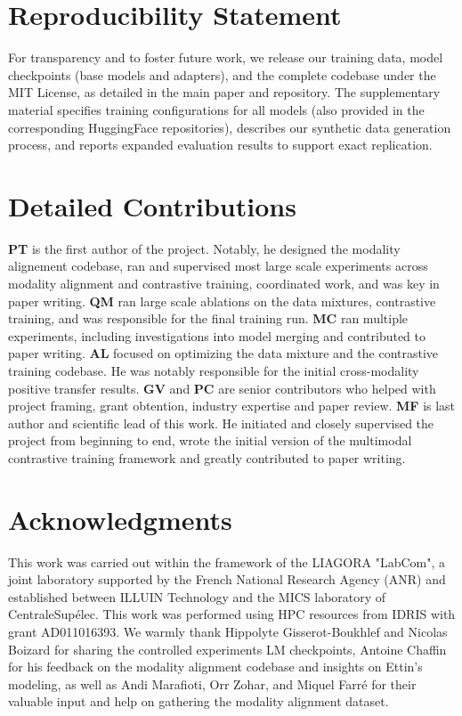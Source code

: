 \documentclass{article} %
\begin{document}
\section*{Reproducibility Statement}
For transparency and to foster future work, we release our training data, model checkpoints (base models and adapters), and the complete codebase under the MIT License, as detailed in the main paper and repository. The supplementary material specifies training configurations for all models (also provided in the corresponding HuggingFace repositories), describes our synthetic data generation process, and reports expanded evaluation results to support exact replication.

\ificlrfinal
\section*{Detailed Contributions}
\textbf{PT} is the first author of the project. Notably, he designed the modality alignement codebase, ran and supervised most large scale experiments across modality alignment and contrastive training, coordinated work, and was key in paper writing. 
\textbf{QM} ran large scale ablations on the data mixtures, contrastive training, and was responsible for the final training run.
\textbf{MC} ran multiple experiments, including investigations into model merging and contributed to paper writing.
\textbf{AL} focused on optimizing the data mixture and the contrastive training codebase. He was notably responsible for the initial cross-modality positive transfer results. 
\textbf{GV} and \textbf{PC} are senior contributors who helped with project framing, grant obtention, industry expertise and paper review.
\textbf{MF} is last author and scientific lead of this work. He initiated and closely supervised the project from beginning to end, wrote the initial version of the multimodal contrastive training framework and greatly contributed to paper writing.


\section*{Acknowledgments}
This work was carried out within the framework of the LIAGORA "LabCom", a joint laboratory supported by the French National Research Agency (ANR) and established between ILLUIN Technology and the MICS laboratory of CentraleSupélec. This work was performed using HPC resources from IDRIS with grant AD011016393. We warmly thank Hippolyte Gisserot-Boukhlef and Nicolas Boizard for sharing the controlled experiments LM checkpoints, Antoine Chaffin for his feedback on the modality alignment codebase and insights on Ettin’s modeling, as well as Andi Marafioti, Orr Zohar, and Miquel Farré for their valuable input and help on gathering the modality alignment dataset.
\fi




\newpage
\appendix

\end{document}
